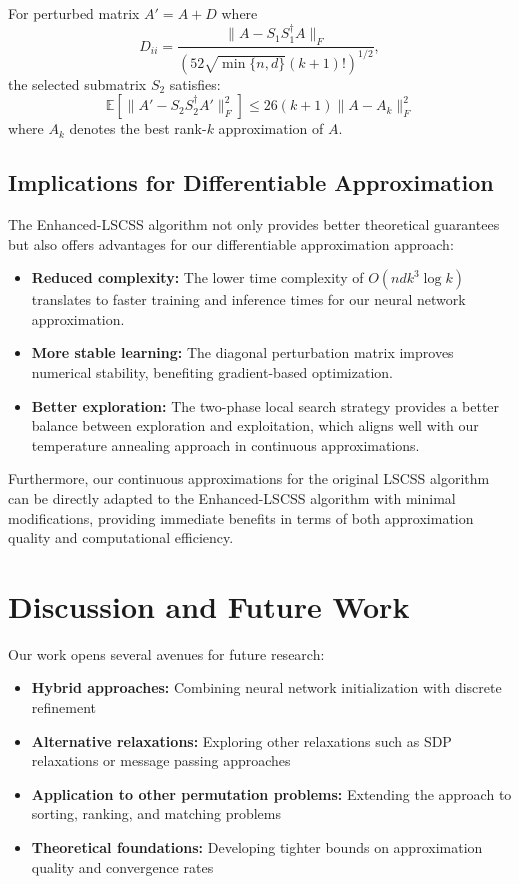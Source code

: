 \documentclass{article}
\begin{document}
\begin{lemma}
For perturbed matrix $A' = A + D$ where 
\[
D_{ii} = \frac{\|A - S_1S_1^\dagger A\|_F}{(52\sqrt{\min\{n,d\}}(k+1)!)^{1/2}},
\]
the selected submatrix $S_2$ satisfies:
\[
\mathbb{E}\left[\|A' - S_2S_2^\dagger A'\|_F^2\right] \leq 26(k+1) \|A - A_k\|_F^2
\]
where $A_k$ denotes the best rank-$k$ approximation of $A$.
\end{lemma}

\subsection{Implications for Differentiable Approximation}
The Enhanced-LSCSS algorithm not only provides better theoretical guarantees but also offers advantages for our differentiable approximation approach:

\begin{itemize}
    \item \textbf{Reduced complexity:} The lower time complexity of $O(ndk^3 \log k)$ translates to faster training and inference times for our neural network approximation.
    \item \textbf{More stable learning:} The diagonal perturbation matrix improves numerical stability, benefiting gradient-based optimization.
    \item \textbf{Better exploration:} The two-phase local search strategy provides a better balance between exploration and exploitation, which aligns well with our temperature annealing approach in continuous approximations.
\end{itemize}

Furthermore, our continuous approximations for the original LSCSS algorithm can be directly adapted to the Enhanced-LSCSS algorithm with minimal modifications, providing immediate benefits in terms of both approximation quality and computational efficiency.

\section{Discussion and Future Work}
Our work opens several avenues for future research:

\begin{itemize}
    \item \textbf{Hybrid approaches:} Combining neural network initialization with discrete refinement
    \item \textbf{Alternative relaxations:} Exploring other relaxations such as SDP relaxations or message passing approaches
    \item \textbf{Application to other permutation problems:} Extending the approach to sorting, ranking, and matching problems
    \item \textbf{Theoretical foundations:} Developing tighter bounds on approximation quality and convergence rates
\end{itemize}
\end{document}
